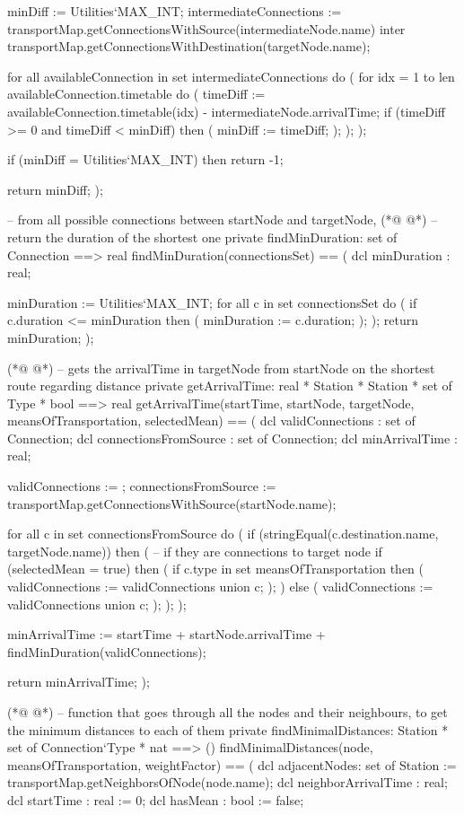 \begin{vdmpp}[breaklines=true]
  minDiff := Utilities`MAX_INT;
  intermediateConnections := transportMap.getConnectionsWithSource(intermediateNode.name) inter
                transportMap.getConnectionsWithDestination(targetNode.name);
  
  for all availableConnection in set intermediateConnections do (
   for idx = 1 to len availableConnection.timetable do (
    timeDiff := availableConnection.timetable(idx) - intermediateNode.arrivalTime;
    if (timeDiff >= 0 and timeDiff < minDiff) then (
     minDiff := timeDiff;
    );
   );
  );
  
  if (minDiff = Utilities`MAX_INT) then
   return -1;
   
  return minDiff;
 );
 

 -- from all possible connections between startNode and targetNode,
(*@
\label{findMinDuration:88}
@*)
 -- return the duration of the shortest one 
 private findMinDuration: set of Connection ==> real
 findMinDuration(connectionsSet) ==
 (
  dcl minDuration : real;
  
  minDuration := Utilities`MAX_INT;
  for all c in set connectionsSet do (
   if c.duration <= minDuration then (
    minDuration := c.duration;
   );
  );
  return minDuration;
 );
 
(*@
\label{getArrivalTime:103}
@*)
 -- gets the arrivalTime in targetNode from startNode on the shortest route regarding distance 
 private getArrivalTime: real * Station * Station * set of Type * bool ==> real
 getArrivalTime(startTime, startNode, targetNode, meansOfTransportation, selectedMean) ==
 (
  dcl validConnections : set of Connection;
  dcl connectionsFromSource : set of Connection;
  dcl minArrivalTime : real;
  
  validConnections := {};
  connectionsFromSource := transportMap.getConnectionsWithSource(startNode.name);
  
  for all c in set connectionsFromSource do (
   if (stringEqual(c.destination.name, targetNode.name)) then ( -- if they are connections to target node 
    if (selectedMean = true) then (
      if c.type in set meansOfTransportation then (
       validConnections := validConnections union {c};
      );
    ) else (
     validConnections := validConnections union {c};
    );
   );
  );
  
  minArrivalTime := startTime + startNode.arrivalTime + findMinDuration(validConnections);
  
  return minArrivalTime;
 );
 
(*@
\label{findMinimalDistances:131}
@*)
 -- function that goes through all the nodes and their neighbours, to get the minimum distances to each of them
 private findMinimalDistances: Station * set of Connection`Type * nat ==> () 
 findMinimalDistances(node, meansOfTransportation, weightFactor) ==
 (
  dcl adjacentNodes: set of Station := transportMap.getNeighborsOfNode(node.name);
  dcl neighborArrivalTime : real;
  dcl startTime : real := 0;
  dcl hasMean : bool := false;
  

\end{vdmpp}
